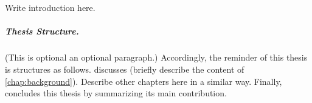\chapter{\introductionname}
\label{chap:introduction}

Write introduction here.


%
\paragraph{Thesis Structure.} %
%

(This is optional an optional paragraph.)
%
Accordingly, the reminder of this thesis is structures as follows.
%
 discusses (briefly describe the content of \cref{chap:background}).
%
Describe other chapters here in a similar way.
%
Finally,  concludes this thesis by summarizing its main contribution.